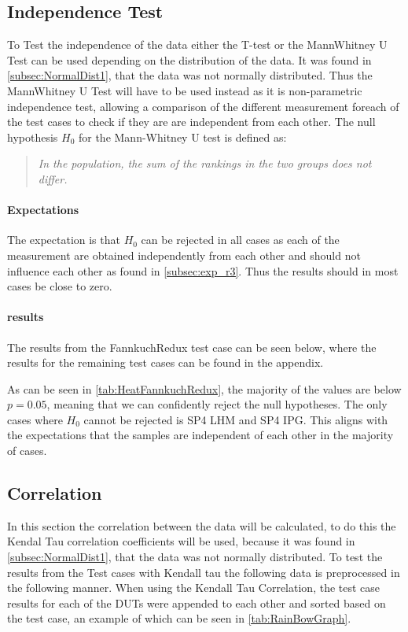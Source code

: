 \subsection{Independence Test}\label{subsec:independence1}
To Test the independence of the data either the T-test or the MannWhitney U Test can be used depending on the distribution of the data. It was found in \cref{subsec:NormalDist1}, that the data was not normally distributed. Thus the MannWhitney U Test will have to be used instead as it is non-parametric independence test, allowing a comparison of the different measurement foreach of the test cases to check if they are are independent from each other. The null hypothesis $H_0$ for the Mann-Whitney U test is defined as:

\begin{quote}
    \textit{In the population, the sum of the rankings in the two groups does not differ.}
\end{quote}

\paragraph{Expectations}
The expectation is that $H_0$ can be rejected in all cases as each of the measurement are obtained independently from each other and should not influence each other as found in \cref{subsec:exp_r3}. Thus the results should in most cases be close to zero.

\paragraph{results}
The results from the FannkuchRedux test case can be seen below, where the results for the remaining test cases can be found in the appendix.
 
As can be seen in \cref{tab:HeatFannkuchRedux}, the majority of the values are below $p = 0.05$, meaning that we can confidently reject the null hypotheses. The only cases where $H_0$ cannot be rejected is SP4 LHM and SP4 IPG. This aligns with the expectations that the samples are independent of each other in the majority of cases.


\subsection{Correlation}\label{subsec:correlation1}
In this section the correlation between the data will be calculated, to do this the Kendal Tau correlation coefficients will be used, because it was found in \cref{subsec:NormalDist1}, that the data was not normally distributed. To test the results from the Test cases with Kendall tau the following data is preprocessed in the following manner. When using the Kendall Tau Correlation, the test case results for each of the DUTs were appended to each other and sorted based on the test case, an example of which can be seen in \cref{tab:RainBowGraph}.

